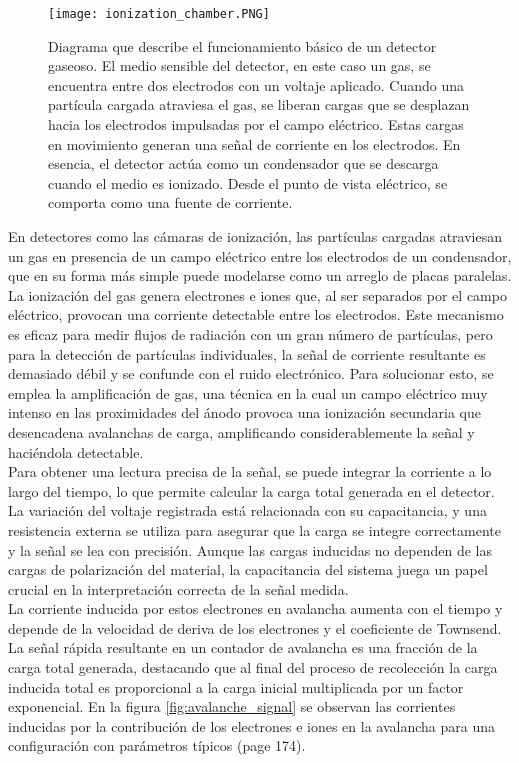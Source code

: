 \documentclass{article}
\begin{document}
\begin{figure}[H]
    \centering
    \texttt{[image: ionization\_chamber.PNG]}
    \caption{Diagrama que describe el funcionamiento básico de un detector gaseoso. El medio sensible del detector, en este caso un gas, se encuentra entre dos electrodos con un voltaje aplicado. Cuando una partícula cargada atraviesa el gas, se liberan cargas que se desplazan hacia los electrodos impulsadas por el campo eléctrico. Estas cargas en movimiento generan una señal de corriente en los electrodos. En esencia, el detector actúa como un condensador que se descarga cuando el medio es ionizado. Desde el punto de vista eléctrico, se comporta como una fuente de corriente.}
    \label{fig:ionization_chamber}
\end{figure}

\noindent En detectores como las cámaras de ionización, las partículas cargadas atraviesan un gas en presencia de un campo eléctrico entre los electrodos de un condensador, que en su forma más simple puede modelarse como un arreglo de placas paralelas. La ionización del gas genera electrones e iones que, al ser separados por el campo eléctrico, provocan una corriente detectable entre los electrodos. Este mecanismo es eficaz para medir flujos de radiación con un gran número de partículas, pero para la detección de partículas individuales, la señal de corriente resultante es demasiado débil y se confunde con el ruido electrónico. Para solucionar esto, se emplea la amplificación de gas, una técnica en la cual un campo eléctrico muy intenso en las proximidades del ánodo provoca una ionización secundaria que desencadena avalanchas de carga, amplificando considerablemente la señal y haciéndola detectable.\\

\noindent Para obtener una lectura precisa de la señal, se puede integrar la corriente a lo largo del tiempo, lo que permite calcular la carga total generada en el detector. La variación del voltaje registrada está relacionada con su capacitancia, y una resistencia externa se utiliza para asegurar que la carga se integre correctamente y la señal se lea con precisión. Aunque las cargas inducidas no dependen de las cargas de polarización del material, la capacitancia del sistema juega un papel crucial en la interpretación correcta de la señal medida.\\

\noindent La corriente inducida por estos electrones en avalancha aumenta con el tiempo y depende de la velocidad de deriva de los electrones y el coeficiente de Townsend. La señal rápida resultante en un contador de avalancha es una fracción de la carga total generada, destacando que al final del proceso de recolección la carga inducida total es proporcional a la carga inicial multiplicada por un factor exponencial. En la figura \ref{fig:avalanche_signal} se observan las corrientes inducidas por la contribución de los electrones e iones en la avalancha para una configuración con parámetros típicos (page 174).
\end{document}
